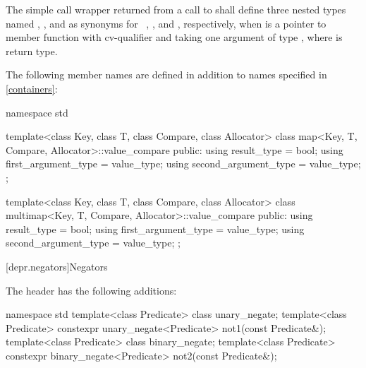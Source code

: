%
%
%
\pnum
The simple call wrapper
returned from a call to 
shall define three nested types
named , , and 
as synonyms for \cv{}~, , and , respectively,
when  is a pointer to member function
with cv-qualifier \cv{}
and taking one argument of type ,
where  is  return type.

\pnum
The following member names are defined in addition to names specified in \ref{containers}:

%
%
%
%
%
%
\begin{codeblock}
namespace std {
  template<class Key, class T, class Compare, class Allocator>
  class map<Key, T, Compare, Allocator>::value_compare {
  public:
    using result_type          = bool;
    using first_argument_type  = value_type;
    using second_argument_type = value_type;
  };

  template<class Key, class T, class Compare, class Allocator>
  class multimap<Key, T, Compare, Allocator>::value_compare {
  public:
    using result_type          = bool;
    using first_argument_type  = value_type;
    using second_argument_type = value_type;
  };
}
\end{codeblock}

[depr.negators]{Negators}

\pnum
The header
%
 has the following additions:

%
%
%
%
\begin{codeblock}
namespace std {
  template<class Predicate> class unary_negate;
  template<class Predicate>
    constexpr unary_negate<Predicate> not1(const Predicate&);
  template<class Predicate> class binary_negate;
  template<class Predicate>
    constexpr binary_negate<Predicate> not2(const Predicate&);
}
\end{codeblock}

